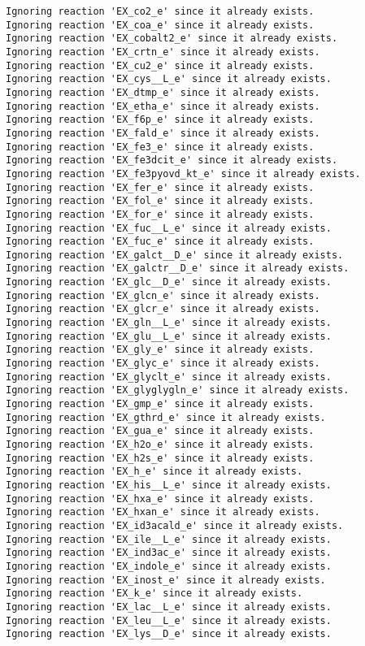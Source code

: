 \documentclass[
  letterpaper,
  DIV=11,
  numbers=noendperiod]{scrartcl}
\begin{document}
\begin{verbatim}
Ignoring reaction 'EX_co2_e' since it already exists.
Ignoring reaction 'EX_coa_e' since it already exists.
Ignoring reaction 'EX_cobalt2_e' since it already exists.
Ignoring reaction 'EX_crtn_e' since it already exists.
Ignoring reaction 'EX_cu2_e' since it already exists.
Ignoring reaction 'EX_cys__L_e' since it already exists.
Ignoring reaction 'EX_dtmp_e' since it already exists.
Ignoring reaction 'EX_etha_e' since it already exists.
Ignoring reaction 'EX_f6p_e' since it already exists.
Ignoring reaction 'EX_fald_e' since it already exists.
Ignoring reaction 'EX_fe3_e' since it already exists.
Ignoring reaction 'EX_fe3dcit_e' since it already exists.
Ignoring reaction 'EX_fe3pyovd_kt_e' since it already exists.
Ignoring reaction 'EX_fer_e' since it already exists.
Ignoring reaction 'EX_fol_e' since it already exists.
Ignoring reaction 'EX_for_e' since it already exists.
Ignoring reaction 'EX_fuc__L_e' since it already exists.
Ignoring reaction 'EX_fuc_e' since it already exists.
Ignoring reaction 'EX_galct__D_e' since it already exists.
Ignoring reaction 'EX_galctr__D_e' since it already exists.
Ignoring reaction 'EX_glc__D_e' since it already exists.
Ignoring reaction 'EX_glcn_e' since it already exists.
Ignoring reaction 'EX_glcr_e' since it already exists.
Ignoring reaction 'EX_gln__L_e' since it already exists.
Ignoring reaction 'EX_glu__L_e' since it already exists.
Ignoring reaction 'EX_gly_e' since it already exists.
Ignoring reaction 'EX_glyc_e' since it already exists.
Ignoring reaction 'EX_glyclt_e' since it already exists.
Ignoring reaction 'EX_glyglygln_e' since it already exists.
Ignoring reaction 'EX_gmp_e' since it already exists.
Ignoring reaction 'EX_gthrd_e' since it already exists.
Ignoring reaction 'EX_gua_e' since it already exists.
Ignoring reaction 'EX_h2o_e' since it already exists.
Ignoring reaction 'EX_h2s_e' since it already exists.
Ignoring reaction 'EX_h_e' since it already exists.
Ignoring reaction 'EX_his__L_e' since it already exists.
Ignoring reaction 'EX_hxa_e' since it already exists.
Ignoring reaction 'EX_hxan_e' since it already exists.
Ignoring reaction 'EX_id3acald_e' since it already exists.
Ignoring reaction 'EX_ile__L_e' since it already exists.
Ignoring reaction 'EX_ind3ac_e' since it already exists.
Ignoring reaction 'EX_indole_e' since it already exists.
Ignoring reaction 'EX_inost_e' since it already exists.
Ignoring reaction 'EX_k_e' since it already exists.
Ignoring reaction 'EX_lac__L_e' since it already exists.
Ignoring reaction 'EX_leu__L_e' since it already exists.
Ignoring reaction 'EX_lys__D_e' since it already exists.

\end{verbatim}
\end{document}
